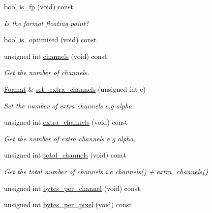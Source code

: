 \begin{DoxyCompactItemize}
bool \hyperlink{class_c_m_s_1_1_format_a33483e2dede190c65351d43a9488abe4}{is\+\_\+fp} (void) const
\begin{DoxyCompactList}\small\item\em Is the format floating point? \end{DoxyCompactList}\item 
bool \hyperlink{class_c_m_s_1_1_format_a096fe4b5f4e2973d96b8899922d7dc37}{is\+\_\+optimised} (void) const
\item 
unsigned int \hyperlink{class_c_m_s_1_1_format_a3c58f7bf8ac3d880c0610672e2c2c4de}{channels} (void) const
\begin{DoxyCompactList}\small\item\em Get the number of channels. \end{DoxyCompactList}\item 
\hyperlink{class_c_m_s_1_1_format}{Format} \& \hyperlink{class_c_m_s_1_1_format_aa69b3e70d5dd930cae560d9fc316147c}{set\+\_\+extra\+\_\+channels} (unsigned int e)
\begin{DoxyCompactList}\small\item\em Set the number of \textquotesingle{}extra\textquotesingle{} channels e.\+g alpha. \end{DoxyCompactList}\item 
unsigned int \hyperlink{class_c_m_s_1_1_format_acd22c5e9c4a61b954b98fced0d7d1874}{extra\+\_\+channels} (void) const
\begin{DoxyCompactList}\small\item\em Get the number of \textquotesingle{}extra\textquotesingle{} channels e.\+g alpha. \end{DoxyCompactList}\item 
unsigned int \hyperlink{class_c_m_s_1_1_format_a2e8ef114e278753a2c3a609ce3e4ce67}{total\+\_\+channels} (void) const
\begin{DoxyCompactList}\small\item\em Get the total number of channels i.\+e \hyperlink{class_c_m_s_1_1_format_a3c58f7bf8ac3d880c0610672e2c2c4de}{channels()} + \hyperlink{class_c_m_s_1_1_format_acd22c5e9c4a61b954b98fced0d7d1874}{extra\+\_\+channels()} \end{DoxyCompactList}\item 
unsigned int \hyperlink{class_c_m_s_1_1_format_ad38cf173ef7aeaf2d9b624fe6b6db796}{bytes\+\_\+per\+\_\+channel} (void) const
\item 
unsigned int \hyperlink{class_c_m_s_1_1_format_a9079b22fbbf174c43f395f290ed4cd71}{bytes\+\_\+per\+\_\+pixel} (void) const

\end{DoxyCompactItemize}
